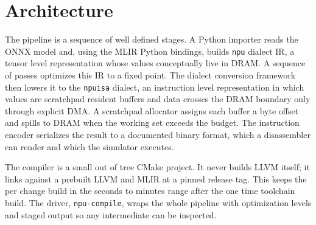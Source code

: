 \section{Architecture}

The pipeline is a sequence of well defined stages. A Python importer reads the
ONNX model and, using the MLIR Python bindings, builds \texttt{npu} dialect IR, a
tensor level representation whose values conceptually live in DRAM. A sequence of
passes optimizes this IR to a fixed point. The dialect conversion framework then
lowers it to the \texttt{npuisa} dialect, an instruction level representation in
which values are scratchpad resident buffers and data crosses the DRAM boundary
only through explicit DMA. A scratchpad allocator assigns each buffer a byte
offset and spills to DRAM when the working set exceeds the budget. The instruction
encoder serializes the result to a documented binary format, which a disassembler
can render and which the simulator executes.

The compiler is a small out of tree CMake project. It never builds LLVM itself; it
links against a prebuilt LLVM and MLIR at a pinned release tag. This keeps the
per change build in the seconds to minutes range after the one time toolchain
build. The driver, \texttt{npu-compile}, wraps the whole pipeline with
optimization levels and staged output so any intermediate can be inspected.
